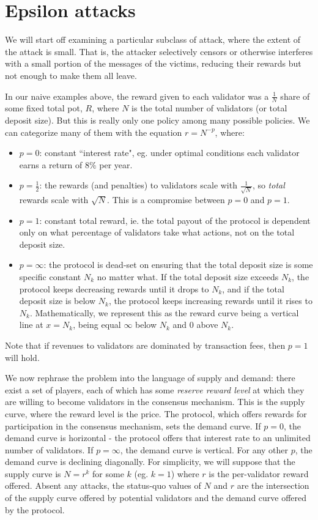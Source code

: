\documentclass[12pt]{article}
\begin{document}
\section{Epsilon attacks}

We will start off examining a particular subclass of attack, where the extent of the attack is small. That is, the attacker selectively censors or otherwise interferes with a small portion of the messages of the victims, reducing their rewards but not enough to make them all leave.

In our naive examples above, the reward given to each validator was a $\frac{1}{N}$ share of some fixed total pot, $R$, where $N$ is the total number of validators (or total deposit size). But this is really only one policy among many possible policies. We can categorize many of them with the equation $r = N^{-p}$, where:

\begin{itemize}
\item $p=0$: constant ``interest rate", eg. under optimal conditions each validator earns a return of $8\%$ per year.
\item $p=\frac{1}{2}$: the rewards (and penalties) to validators scale with $\frac{1}{\sqrt{N}}$, so \textit{total} rewards scale with $\sqrt{N}$. This is a compromise between $p=0$ and $p=1$. 
\item $p=1$: constant total reward, ie. the total payout of the protocol is dependent only on what percentage of validators take what actions, not on the total deposit size.
\item $p=\infty$: the protocol is dead-set on ensuring that the total deposit size is some specific constant $N_k$ no matter what. If the total deposit size exceeds $N_k$, the protocol keeps decreasing rewards until it drops to $N_k$, and if the total deposit size is below $N_k$, the protocol keeps increasing rewards until it rises to $N_k$. Mathematically, we represent this as the reward curve being a vertical line at $x = N_k$, being equal $\infty$ below $N_k$ and $0$ above $N_k$.
\end{itemize}

Note that if revenues to validators are dominated by transaction fees, then $p=1$ will hold.

We now rephrase the problem into the language of supply and demand: there exist a set of players, each of which has some \textit{reserve reward level} at which they are willing to become validators in the consensus mechanism. This is the supply curve, where the reward level is the price. The protocol, which offers rewards for participation in the consensus mechanism, sets the demand curve. If $p=0$, the demand curve is horizontal - the protocol offers that interest rate to an unlimited number of validators. If $p=\infty$, the demand curve is vertical. For any other $p$, the demand curve is declining diagonally. For simplicity, we will suppose that the supply curve is $N = r^k$ for some $k$ (eg. $k = 1$) where $r$ is the per-validator reward offered. Absent any attacks, the status-quo values of $N$ and $r$ are the intersection of the supply curve offered by potential validators and the demand curve offered by the protocol.
\end{document}

